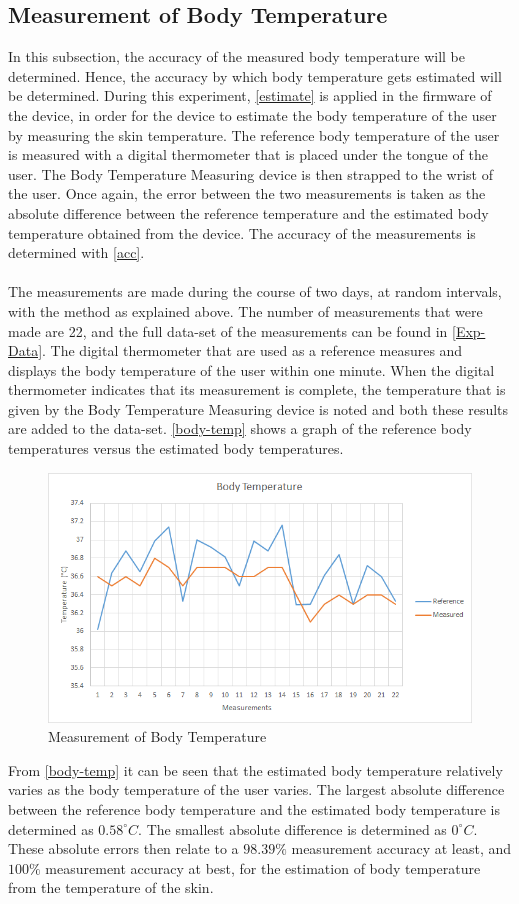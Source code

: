 \subsection{Measurement of Body Temperature}\label{MBT}
In this subsection, the accuracy of the measured body temperature will be determined. Hence, the accuracy by which body temperature gets estimated will be determined. During this experiment, \autoref{estimate} is applied in the firmware of the device, in order for the device to estimate the body temperature of the user by measuring the skin temperature. The reference body temperature of the user is measured with a digital thermometer that is placed under the tongue of the user. The Body Temperature Measuring device is then strapped to the wrist of the user. Once again, the error between the two measurements is taken as the absolute difference between the reference temperature and the estimated body temperature obtained from the device. The accuracy of the measurements is determined with \autoref{acc}.
\\
\\
The measurements are made during the course of two days, at random intervals, with the method as explained above. The number of measurements that were made are 22, and the full data-set of the measurements can be found in \autoref{Exp-Data}. The digital thermometer that are used as a reference measures and displays the body temperature of the user within one minute. When the digital thermometer indicates that its measurement is complete, the temperature that is given by the Body Temperature Measuring device is noted and both these results are added to the data-set. \autoref{body-temp} shows a graph of the reference body temperatures versus the estimated body temperatures.
\begin{figure}[H]
	\centering
	\includegraphics[scale=0.7]{img/Body-Temp.png}
	\caption{Measurement of Body Temperature}
	\label{body-temp}
\end{figure}
\noindent
From \autoref{body-temp} it can be seen that the estimated body temperature relatively varies as the body temperature of the user varies. The largest absolute difference between the reference body temperature and the estimated body temperature is determined as $ 0.58^{\circ} C $. The smallest absolute difference is determined as $ 0^{\circ} C $. These absolute errors then relate to a $ 98.39 \%$ measurement accuracy at least, and $ 100 \% $ measurement accuracy at best, for the estimation of body temperature from the temperature of the skin.

